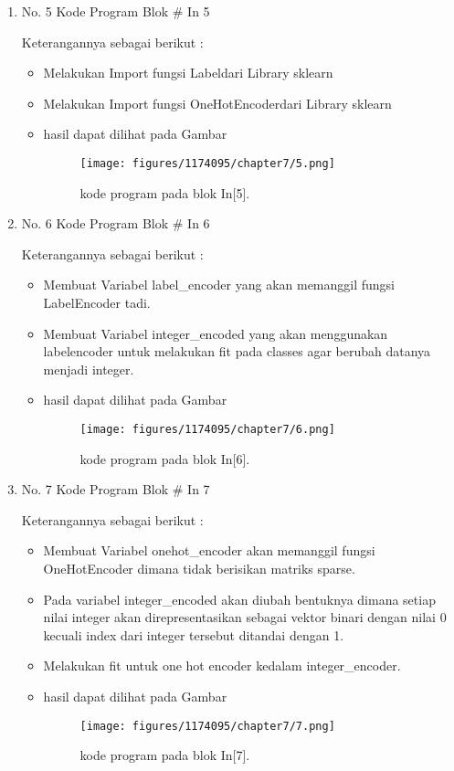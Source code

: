 \begin{enumerate}
\item No. 5 Kode Program Blok \# In 5
\par 
Keterangannya sebagai berikut :
\begin{itemize}
\item Melakukan Import fungsi Labeldari Library sklearn 
\item Melakukan Import fungsi OneHotEncoderdari Library sklearn
\item hasil dapat dilihat pada Gambar
\begin{figure}[H]
    \texttt{[image: figures/1174095/chapter7/5.png]}
    \centering
    \caption{kode program pada blok  In[5].}
    \end{figure}
\end{itemize}



\item No. 6 Kode Program Blok \# In 6
\par 
Keterangannya sebagai berikut :
\begin{itemize}
\item Membuat Variabel label\_encoder yang akan memanggil fungsi LabelEncoder tadi.
\item Membuat Variabel integer\_encoded yang akan menggunakan labelencoder untuk melakukan fit pada classes agar berubah datanya menjadi integer.
\item hasil dapat dilihat pada Gambar
\begin{figure}[H]
    \texttt{[image: figures/1174095/chapter7/6.png]}
    \centering
    \caption{kode program pada blok  In[6].}
    \end{figure}
\end{itemize}



\item No. 7 Kode Program Blok \# In 7
\par 
Keterangannya sebagai berikut :
\begin{itemize}
\item Membuat Variabel onehot\_encoder akan memanggil fungsi OneHotEncoder dimana tidak berisikan matriks sparse.
\item Pada variabel integer\_encoded akan diubah bentuknya dimana setiap nilai integer akan direpresentasikan sebagai vektor binari dengan nilai 0 kecuali index dari integer tersebut ditandai dengan 1.
\item Melakukan fit untuk one hot encoder kedalam integer\_encoder.
\item hasil dapat dilihat pada Gambar
\begin{figure}[H]
    \texttt{[image: figures/1174095/chapter7/7.png]}
    \centering
    \caption{kode program pada blok  In[7].}
    \end{figure}
\end{itemize}




\end{enumerate}
